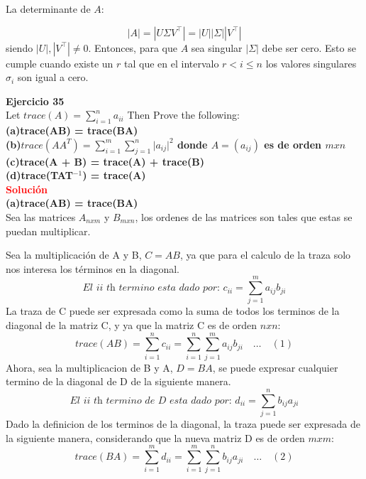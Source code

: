 \documentclass[12pt]{article}
\begin{document}
\begin{enumerate}
La determinante de $A$:

\begin{equation}
    \left| A \right| = \left| U \Sigma V^\intercal \right| = \left| U \right| \left| \Sigma \right| \left| V^\intercal \right|
\end{equation}
siendo $\left| U \right|, \left| V^\intercal \right| \neq 0$. Entonces, para que $A$ sea singular $\left| \Sigma \right|$ debe ser cero. Esto se cumple cuando existe un $r$ tal que en el intervalo $r < i \leq n$ los valores singulares $\sigma_i$ son igual a cero.

\end{enumerate}

\noindent \textbf{Ejercicio 35}\\
Let $trace(A) = \sum_{i=1}^n a_{ii}$ Then Prove the following:\\

    \textbf{(a)\quad trace(AB) = trace(BA)}\\
    \textbf{(b)\quad $trace(AA^{T}) =  \sum_{i=1}^m\sum_{j=1}^n {\vert{a_{ij}}\vert}^2$ donde $ A = (a_{ij})$ es de orden $mxn$}\\
    \textbf{(c)\quad trace(A + B) = trace(A) + trace(B)}\\
    \textbf{(d)\quad trace(TAT$^{-1}$) = trace(A)}\\

\noindent \textcolor{red}{\bf Solución}\\

\textbf{(a)\quad trace(AB) = trace(BA)}\\

    Sea las matrices $A_{nxm}$ y $B_{mxn}$, los ordenes de las matrices son tales que estas se puedan multiplicar.
    
    Sea la multiplicación de A y B, $C = AB$, ya que para el calculo de la traza solo nos interesa los términos en la diagonal.
    \[
    	\textit{El {ii} th termino esta dado por: }c_{ii} = \sum_{j=1}^m a_{ij}b_{ji}
    \]
    La traza de C puede ser expresada como la suma de todos los terminos de la diagonal de la matriz C, y ya que la matriz C es de orden $nxn$:
    \[
    	trace(AB) = \sum_{i=1}^n c_{ii}= \sum_{i=1}^n\sum_{j=1}^m a_{ij}b_{ji} \quad\dots\quad (1)
    \]
    Ahora, sea la multiplicacion de B y A, $D = BA$, se puede expresar cualquier termino de la diagonal de D de la siguiente manera.
    \[
    	\textit{El {ii} th termino de D esta dado por: }d_{ii} = \sum_{j=1}^n b_{ij}a_{ji}
    \]
    Dado la definicion de los terminos de la diagonal, la traza puede ser expresada de la siguiente manera, considerando que la nueva matriz D es de orden $mxm$:
    \[
    	trace(BA) = \sum_{i=1}^m d_{ii}= \sum_{i=1}^m\sum_{j=1}^n b_{ij}a_{ji}\quad\dots\quad (2)
    \]
    
\end{document}
